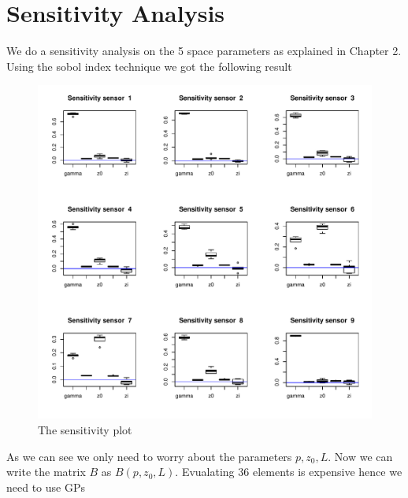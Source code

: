 \documentclass[12pt]{book}
\begin{document}
\section{Sensitivity Analysis}
We do a sensitivity analysis on the 5 space parameters as explained in Chapter 2. Using the sobol index technique we
got the following result
\begin{figure}[H]
\centering
\includegraphics[scale=0.5]{./FigChap4/sensitivityPlot}
\caption{The sensitivity plot}
\end{figure}
As we can see we only need to worry about the parameters $p,z_{0},L$.
Now we can write the matrix $B$ as $B(p,z_{0},L)$. Evualating $36$ elements
is expensive hence we need to use GPs
\end{document}
